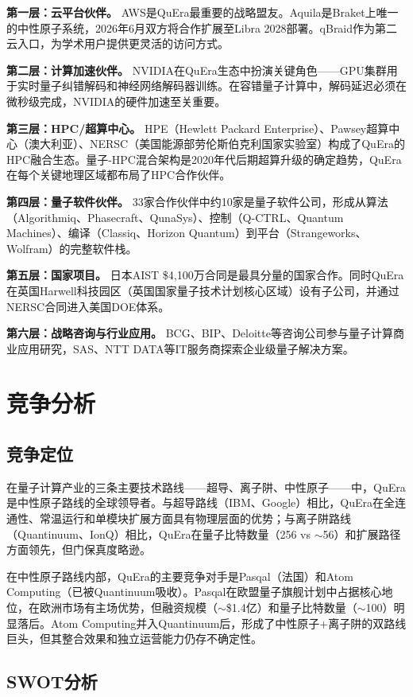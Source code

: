 \documentclass[11pt,a4paper]{ctexart}
\begin{document}
\textbf{第一层：云平台伙伴。} AWS是QuEra最重要的战略盟友。Aquila是Braket上唯一的中性原子系统，2026年6月双方将合作扩展至Libra 2028部署。qBraid作为第二云入口，为学术用户提供更灵活的访问方式。

\textbf{第二层：计算加速伙伴。} NVIDIA在QuEra生态中扮演关键角色——GPU集群用于实时量子纠错解码和神经网络解码器训练。在容错量子计算中，解码延迟必须在微秒级完成，NVIDIA的硬件加速至关重要。

\textbf{第三层：HPC/超算中心。} HPE（Hewlett Packard Enterprise）、Pawsey超算中心（澳大利亚）、NERSC（美国能源部劳伦斯伯克利国家实验室）构成了QuEra的HPC融合生态。量子-HPC混合架构是2020年代后期超算升级的确定趋势，QuEra在每个关键地理区域都布局了HPC合作伙伴。

\textbf{第四层：量子软件伙伴。} 33家合作伙伴中约10家是量子软件公司，形成从算法（Algorithmiq、Phasecraft、QunaSys）、控制（Q-CTRL、Quantum Machines）、编译（Classiq、Horizon Quantum）到平台（Strangeworks、Wolfram）的完整软件栈。

\textbf{第五层：国家项目。} 日本AIST \$4,100万合同是最具分量的国家合作。同时QuEra在英国Harwell科技园区（英国国家量子技术计划核心区域）设有子公司，并通过NERSC合同进入美国DOE体系。

\textbf{第六层：战略咨询与行业应用。} BCG、BIP、Deloitte等咨询公司参与量子计算商业应用研究，SAS、NTT DATA等IT服务商探索企业级量子解决方案。

\section{竞争分析}

\subsection{竞争定位}
在量子计算产业的三条主要技术路线——超导、离子阱、中性原子——中，QuEra是中性原子路线的全球领导者。与超导路线（IBM、Google）相比，QuEra在全连通性、常温运行和单模块扩展方面具有物理层面的优势；与离子阱路线（Quantinuum、IonQ）相比，QuEra在量子比特数量（256 vs $\sim$56）和扩展路径方面领先，但门保真度略逊。

在中性原子路线内部，QuEra的主要竞争对手是Pasqal（法国）和Atom Computing（已被Quantinuum吸收）。Pasqal在欧盟量子旗舰计划中占据核心地位，在欧洲市场有主场优势，但融资规模（$\sim$\$1.4亿）和量子比特数量（$\sim$100）明显落后。Atom Computing并入Quantinuum后，形成了中性原子+离子阱的双路线巨头，但其整合效果和独立运营能力仍存不确定性。

\subsection{SWOT分析}
\end{document}
